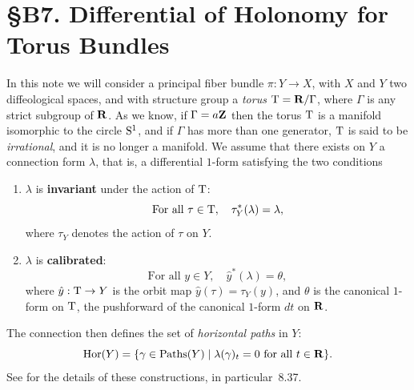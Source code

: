 
\chapter*{\S B7. Differential of Holonomy for Torus Bundles}
\setcounter{footnote}{0}


\begin{abstract}
  We make explicit the holonomy function on a torus bundle over a diffeological space.
  Here the word torus denotes any quotient $\Torus=\RR/\Gamma$,
  where $\Gamma$ is a strict subgroup of $\RR$.
  Then,
  we give an explicit formula for the differential of the holonomy in terms of the Chain-Homotopy Operator and the curvature.
\end{abstract}

In this note we will consider a principal fiber bundle $\pi : Y \to X$,
with $X$ and $Y$ two diffeological spaces,
and with structure group a \emph{torus} $\Torus = \RR/\Gamma$,
where $\Gamma$ is any strict subgroup of $\RR$.
As we know,
if $\Gamma = a \mathbf{Z}$ then the torus $\mathrm{T}$ is a manifold isomorphic to the circle $\mathrm{S}^1$,
and if $\Gamma$ has more than one generator,
$\mathrm{T}$ is said to be \emph{irrational},
and it is no longer a manifold.
We assume that there exists on $Y$ a connection form $\lambda$,
that is,
a differential $1$-form satisfying the two conditions
\begin{enumerate}
  \item $\lambda$ is \textbf{invariant} under the action of $\mathrm{T}$:
  $$%
    \mbox{For all $\tau \in \Torus$}, \quad \tau_Y^*(\lambda) = \lambda,
    $$%
  where $\tau_Y$ denotes the action of $\tau$ on $Y$.
  \item $\lambda$ is \textbf{calibrated}:
  $$%
    \mbox{For all $y \in Y$}, \quad \hat y^*(\lambda) = \theta,
    $$%
  where $\hat y : \mathrm{T} \to Y$ is the orbit map $\hat y(\tau) = \tau_Y(y)$,
  and $\theta$ is the canonical $1$-form on $\mathrm{T}$,
  the pushforward of the canonical $1$-form $dt$ on $\RR$.
\end{enumerate}
The connection then defines the set of \emph{horizontal paths} in $Y$:
$$%
  \mbox{Hor}(Y) = \{ \gamma \in \Paths(Y) \mid \lambda(\gamma)_t = 0 \mbox{ for all } t \in \RR \}.
  $$%
See \cite{PIZ13} for the details of these constructions,
in particular \textsection\,8.37.

